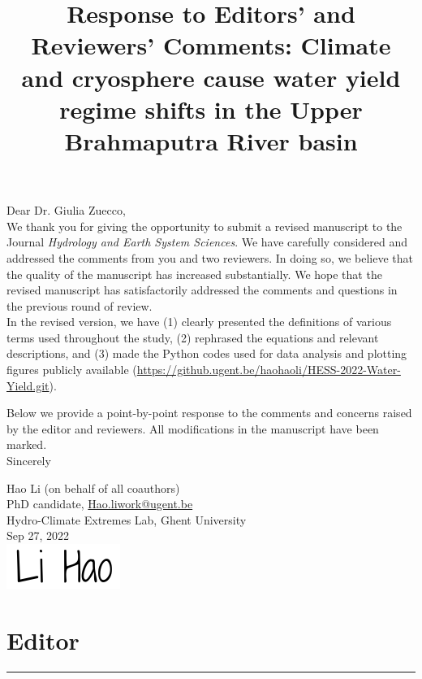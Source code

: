 \documentclass[11pt]{article}
\title{\raggedright {Response to Editors' and Reviewers' Comments:}
{\textbf{Climate and cryosphere cause water yield regime shifts in the Upper Brahmaputra River basin}}}
\newcounter{reviewer}
\newcounter{point}[reviewer]
\newcommand{\editorsection}{\newpage \section*{Editor} \hrule}
\begin{document}
\date{}
\author{}
\maketitle
Dear Dr. Giulia Zuecco, \\

We thank you for giving the opportunity to submit a revised manuscript to the Journal \textit{Hydrology and Earth System Sciences}. We have carefully considered and addressed the comments from you and two reviewers. In doing so, we believe that the quality of the manuscript has increased substantially. We hope that the revised manuscript has satisfactorily addressed the comments and questions in the previous round of review.  \\

In the revised version, we have (1) clearly presented the definitions of various terms used throughout the study, (2) rephrased the equations and relevant descriptions, and (3) made the Python codes used for data analysis and plotting figures publicly available (\url{https://github.ugent.be/haohaoli/HESS-2022-Water-Yield.git}). 

Below we provide a point-by-point response to the comments and concerns raised by the editor and reviewers. All modifications in the manuscript have been marked. \\

Sincerely

\begin{flushleft}

Hao Li (on behalf of all coauthors)  \\
PhD candidate, \url{Hao.liwork@ugent.be} \\
Hydro-Climate Extremes Lab, Ghent University \\
Sep 27, 2022 \\
\includegraphics[width=.15\textwidth]{02-figures/signature.png} \par
\end{flushleft}

\editorsection
\end{document}
